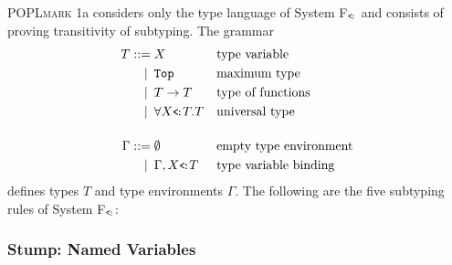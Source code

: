 \documentclass[a4paper,11pt]{article}
\newcommand{\name}[1]{\textsc{#1}\xspace}
\def\POPLmark{\name{POPLmark}}
\begin{document}
\POPLmark 1a considers only the type language of System
F$_\texttt{<\!:}$ and consists of proving transitivity of
subtyping. The grammar
\begin{align*}
  T ::=             &\; X
  && \text{type variable} \\
  \llap{\textbar\:} &\; \texttt{Top}
  && \text{maximum type} \\
  \llap{\textbar\:} &\; T \rightarrow T
  && \text{type of functions} \\
  \llap{\textbar\:} &\; \forall X\texttt{\small<\!:}T.T
  && \text{universal type} \\[1.2em]
  \Gamma ::=        &\; \emptyset
  && \text{empty type environment} \\
  \llap{\textbar\:} &\; \Gamma, X \texttt{\small<\!:}T
  && \text{type variable binding}
\end{align*}
defines types $T$ and type environments $\Gamma$. The following are
the five subtyping rules of System F$_\texttt{<\!:}$:

\subsubsection*{Stump: Named Variables}
\end{document}
